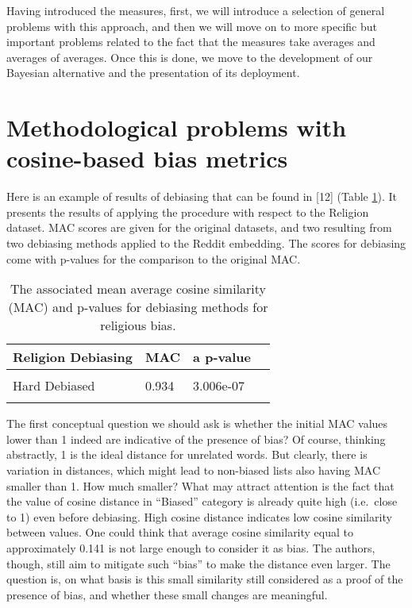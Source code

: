 \documentclass[
  12pt,
  dvipsnames,enabledeprecatedfontcommands]{scrartcl}
\begin{document}
Having introduced the measures, first, we will introduce a selection of
general problems with this approach, and then we will move on to more
specific but important problems related to the fact that the measures
take averages and averages of averages. Once this is done, we move to
the development of our Bayesian alternative and the presentation of its
deployment.

\hypertarget{methodological-problems-with-cosine-based-bias-metrics}{%
\section{Methodological problems with cosine-based bias
metrics}\label{methodological-problems-with-cosine-based-bias-metrics}}

Here is an example of results of debiasing that can be found in {[}12{]}
(Table \ref{tab:religionOriginal2}). It presents the results of applying
the procedure with respect to the Religion dataset. \textsf{MAC} scores
are given for the original datasets, and two resulting from two
debiasing methods applied to the Reddit embedding. The scores for
debiasing come with p-values for the comparison to the original
\textsf{MAC}.

\begin{table}[H]
\footnotesize

\centering

\begin{tabular}[t]{lllr}
\toprule
Religion Debiasing & \textsf{MAC} & a p-value \\
\midrule
\cellcolor{gray!15}{Biased} & \cellcolor{gray!15}{0.859} & \cellcolor{gray!15}{N/A} \\
Hard Debiased & 0.934 & 3.006e-07\\
\cellcolor{gray!15}{Soft Debiased ($\lambda$ = 0.2)} & \cellcolor{gray!15}{0.894} & \cellcolor{gray!15}{0.007} \\
\bottomrule
\end{tabular}

\caption{The associated mean average cosine similarity
(\textsf{MAC}) and p-values for debiasing methods for religious bias.}
\label{tab:religionOriginal2}
\normalsize 
\end{table}

The first conceptual question we should ask is whether the initial
\textsf{MAC} values lower than 1 indeed are indicative of the presence
of bias? Of course, thinking abstractly, 1 is the ideal distance for
unrelated words. But clearly, there is variation in distances, which
might lead to non-biased lists also having \textsf{MAC} smaller than 1.
How much smaller? What may attract attention is the fact that the value
of cosine distance in ``Biased'' category is already quite high
(i.e.~close to 1) even before debiasing. High cosine distance indicates
low cosine similarity between values. One could think that average
cosine similarity equal to approximately 0.141 is not large enough to
consider it as bias. The authors, though, still aim to mitigate such
``bias'' to make the distance even larger. The question is, on what
basis is this small similarity still considered as a proof of the
presence of bias, and whether these small changes are meaningful.
\end{document}
